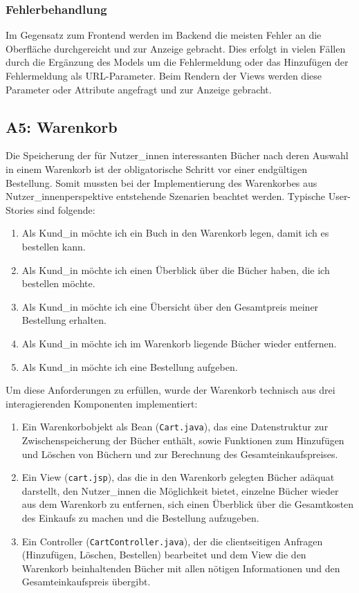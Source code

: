 		\subsubsection{Fehlerbehandlung}
		Im Gegensatz zum Frontend werden im Backend die meisten Fehler an die Oberfläche durchgereicht und zur Anzeige gebracht. Dies erfolgt in vielen Fällen durch die Ergänzung des Models um die Fehlermeldung oder das Hinzufügen der Fehlermeldung als URL-Parameter. Beim Rendern der Views werden diese Parameter oder Attribute angefragt und zur Anzeige gebracht.
	
	\subsection{A5: Warenkorb}\label{sec:umsetzung:cart}
	Die Speicherung der für Nutzer\_innen interessanten Bücher nach deren Auswahl in einem Warenkorb ist der obligatorische Schritt vor einer endgültigen Bestellung. Somit mussten bei der Implementierung des Warenkorbes aus Nutzer\_innenperspektive entstehende Szenarien beachtet werden. Typische User-Stories sind folgende:
	
	\begin{enumerate}
		\item Als Kund\_in möchte ich ein Buch in den Warenkorb legen, damit ich es bestellen kann.
		\item Als Kund\_in möchte ich einen Überblick über die Bücher haben, die ich bestellen möchte.
		\item Als Kund\_in möchte ich eine Übersicht über den Gesamtpreis meiner Bestellung erhalten.
		\item Als Kund\_in möchte ich im Warenkorb liegende Bücher wieder entfernen.
		\item Als Kund\_in möchte ich eine Bestellung aufgeben.
	\end{enumerate}
	
	Um diese Anforderungen zu erfüllen, wurde der Warenkorb technisch aus drei interagierenden Komponenten implementiert:
	\begin{enumerate}
		\item Ein Warenkorbobjekt als Bean (\lstinline|Cart.java|), das eine Datenstruktur zur Zwi\-schen\-spei\-che\-rung der Bücher enthält, sowie Funktionen zum Hinzufügen und Lö\-schen von Büchern und zur Berechnung des Gesamteinkaufspreises.
		\item Ein View (\lstinline|cart.jsp|), das die in den Warenkorb gelegten Bücher adäquat darstellt, den Nutzer\_innen die Möglichkeit bietet, einzelne Bücher wieder aus dem Warenkorb zu entfernen, sich einen Überblick über die Gesamtkosten des Einkaufs zu machen und die Bestellung aufzugeben.
		\item Ein Controller (\lstinline|CartController.java|), der die clientseitigen Anfragen (Hinzufügen, Löschen, Bestellen) bearbeitet und dem View die den Warenkorb beinhaltenden Bücher mit allen nötigen Informationen und den Gesamteinkaufspreis übergibt.
	\end{enumerate}

